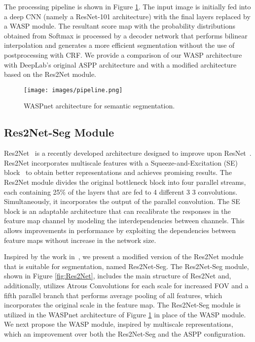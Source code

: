 \documentclass[sensors,article,accept,moreauthors,pdftex]{Definitions/mdpi}
\begin{document}
The processing pipeline is shown in Figure \ref{fig:pipeline}. The input image is initially fed into a deep CNN (namely a ResNet-101 architecture) with the final layers replaced by a WASP module. The resultant score map with the probability distributions obtained from Softmax is processed by a decoder network that performs bilinear interpolation and generates a more efficient segmentation without the use of postprocessing with CRF. We provide a comparison of our WASP architecture with DeepLab's original ASPP architecture and with a modified architecture based on the Res2Net module.

\begin{figure}[H]
\centering
\texttt{[image: images/pipeline.png]}
\caption{WASPnet architecture for semantic segmentation.}
\label{fig:pipeline}
\end{figure}

\subsection{Res2Net-Seg Module}
Res2Net~\cite{Res2Net} is a recently developed architecture designed to improve upon  ResNet~\cite{ResNet}.
Res2Net incorporates multiscale features with a Squeeze-and-Excitation (SE) block~\cite{SE} to obtain better representations and achieves promising results. The Res2Net module divides the original bottleneck block into four parallel streams, each containing 25\% of the layers that are fed to 4 different 3  3 convolutions. Simultaneously, it incorporates the output of the parallel convolution.
The SE block is an adaptable architecture that can recalibrate the responses in the feature map channel by modeling the interdependencies between channels. This allows improvements in performance by exploiting the dependencies between feature maps without increase in the network size.


Inspired by the work in~\cite{Res2Net}, we present a modified version of the Res2Net module that is suitable for segmentation, named Res2Net-Seg. The Res2Net-Seg module, shown in Figure \ref{fig:Res2Net}, includes the main structure of Res2Net and, additionally, utilizes Atrous Convolutions for each scale for increased FOV and a fifth parallel branch that performs average pooling of all features, which incorporates the original scale in the feature map.
The Res2Net-Seg module is utilized in the WASPnet architecture of Figure \ref{fig:pipeline} in place of the WASP module.
We next propose the WASP module, inspired by multiscale representations, which an improvement over both the Res2Net-Seg and the ASPP configuration.
\end{document}
